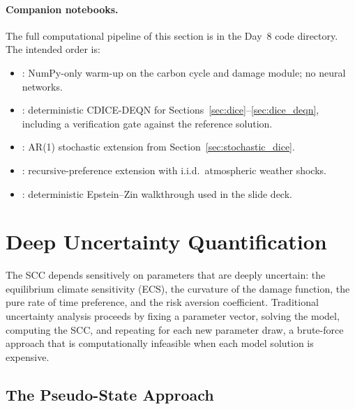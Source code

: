 \documentclass[11pt,a4paper]{report}
\begin{document}
\paragraph{Companion notebooks.}
The full computational pipeline of this section is in the Day~8 code directory.  The intended order is:
\begin{itemize}[itemsep=2pt,leftmargin=*]
\item {}: NumPy-only warm-up on the carbon cycle and damage module; no neural networks.
\item {}: deterministic CDICE-DEQN for Sections~\ref{sec:dice}--\ref{sec:dice_deqn}, including a verification gate against the reference solution.
\item {}: AR(1) stochastic extension from Section~\ref{sec:stochastic_dice}.
\item {}: recursive-preference extension with i.i.d.\ atmospheric weather shocks.
\item {}: deterministic Epstein--Zin walkthrough used in the slide deck.
\end{itemize}

\section{Deep Uncertainty Quantification}
\label{sec:deep_uq}

The SCC depends sensitively on parameters that are deeply uncertain: the equilibrium climate sensitivity (ECS), the curvature of the damage function, the pure rate of time preference, and the risk aversion coefficient.  Traditional uncertainty analysis proceeds by fixing a parameter vector, solving the model, computing the SCC, and repeating for each new parameter draw, a brute-force approach that is computationally infeasible when each model solution is expensive.

\subsection{The Pseudo-State Approach}
\end{document}
